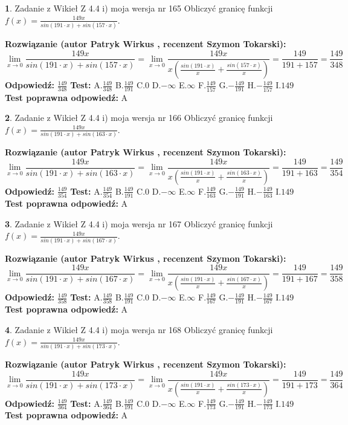 \documentclass[12pt, a4paper]{article}
\theoremstyle{definition} %
\newtheorem{zad}{}
\newcommand{\zadStart}[1]{\begin{zad}#1\newline}
\newcommand{\zadStop}{\end{zad}}
\newcommand{\rozwStart}[2]{\noindent \textbf{Rozwiązanie (autor #1 , recenzent #2): }\newline}
\newcommand{\rozwStop}{\newline}
\newcommand{\odpStart}{\noindent \textbf{Odpowiedź:}\newline}
\newcommand{\odpStop}{\newline}
\newcommand{\testStart}{\noindent \textbf{Test:}\newline}
\newcommand{\testStop}{\newline}
\newcommand{\kluczStart}{\noindent \textbf{Test poprawna odpowiedź:}\newline}
\newcommand{\kluczStop}{\newline}
\begin{document}
\zadStart{Zadanie z Wikieł Z 4.4 i) moja wersja nr 165}
Obliczyć granicę funkcji $f(x)=\frac{149x}{sin(191\cdot x) +sin(157\cdot x)}$.
\zadStop
\rozwStart{Patryk Wirkus}{Szymon Tokarski}
$$\lim\limits_{x\to 0}\frac{149x}{sin(191\cdot x) +sin(157\cdot x)}=\lim\limits_{x\to 0}\frac{149x}{x(\frac{sin(191\cdot x)}{x}+\frac{sin(157\cdot x)}{x})}=\frac{149}{191+157} = \frac{149}{348}$$
\rozwStop
\odpStart
$\frac{149}{348}$
\odpStop
\testStart
A.$\frac{149}{348}$
B.$\frac{149}{191}$
C.$0$
D.$-\infty$
E.$\infty$
F.$\frac{149}{157}$
G.$-\frac{149}{191}$
H.$-\frac{149}{157}$
I.$149$
\testStop
\kluczStart
A
\kluczStop



\zadStart{Zadanie z Wikieł Z 4.4 i) moja wersja nr 166}
Obliczyć granicę funkcji $f(x)=\frac{149x}{sin(191\cdot x) +sin(163\cdot x)}$.
\zadStop
\rozwStart{Patryk Wirkus}{Szymon Tokarski}
$$\lim\limits_{x\to 0}\frac{149x}{sin(191\cdot x) +sin(163\cdot x)}=\lim\limits_{x\to 0}\frac{149x}{x(\frac{sin(191\cdot x)}{x}+\frac{sin(163\cdot x)}{x})}=\frac{149}{191+163} = \frac{149}{354}$$
\rozwStop
\odpStart
$\frac{149}{354}$
\odpStop
\testStart
A.$\frac{149}{354}$
B.$\frac{149}{191}$
C.$0$
D.$-\infty$
E.$\infty$
F.$\frac{149}{163}$
G.$-\frac{149}{191}$
H.$-\frac{149}{163}$
I.$149$
\testStop
\kluczStart
A
\kluczStop



\zadStart{Zadanie z Wikieł Z 4.4 i) moja wersja nr 167}
Obliczyć granicę funkcji $f(x)=\frac{149x}{sin(191\cdot x) +sin(167\cdot x)}$.
\zadStop
\rozwStart{Patryk Wirkus}{Szymon Tokarski}
$$\lim\limits_{x\to 0}\frac{149x}{sin(191\cdot x) +sin(167\cdot x)}=\lim\limits_{x\to 0}\frac{149x}{x(\frac{sin(191\cdot x)}{x}+\frac{sin(167\cdot x)}{x})}=\frac{149}{191+167} = \frac{149}{358}$$
\rozwStop
\odpStart
$\frac{149}{358}$
\odpStop
\testStart
A.$\frac{149}{358}$
B.$\frac{149}{191}$
C.$0$
D.$-\infty$
E.$\infty$
F.$\frac{149}{167}$
G.$-\frac{149}{191}$
H.$-\frac{149}{167}$
I.$149$
\testStop
\kluczStart
A
\kluczStop



\zadStart{Zadanie z Wikieł Z 4.4 i) moja wersja nr 168}
Obliczyć granicę funkcji $f(x)=\frac{149x}{sin(191\cdot x) +sin(173\cdot x)}$.
\zadStop
\rozwStart{Patryk Wirkus}{Szymon Tokarski}
$$\lim\limits_{x\to 0}\frac{149x}{sin(191\cdot x) +sin(173\cdot x)}=\lim\limits_{x\to 0}\frac{149x}{x(\frac{sin(191\cdot x)}{x}+\frac{sin(173\cdot x)}{x})}=\frac{149}{191+173} = \frac{149}{364}$$
\rozwStop
\odpStart
$\frac{149}{364}$
\odpStop
\testStart
A.$\frac{149}{364}$
B.$\frac{149}{191}$
C.$0$
D.$-\infty$
E.$\infty$
F.$\frac{149}{173}$
G.$-\frac{149}{191}$
H.$-\frac{149}{173}$
I.$149$
\testStop
\kluczStart
A
\kluczStop
\end{document}

